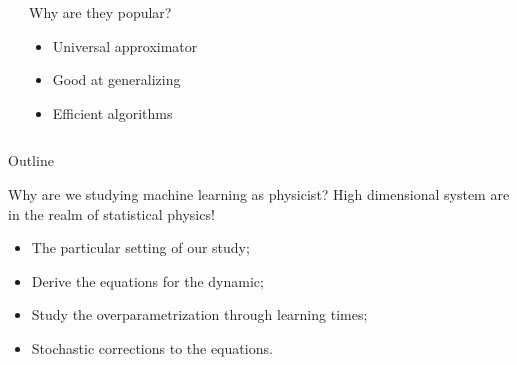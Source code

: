 \documentclass{beamer}
\begin{document}
\begin{frame}
\begin{columns}
    \begin{center}
      \begin{tikzpicture}[x=1.3cm, y=.78cm, >=latex]
      
      \end{tikzpicture}
    \end{center}

  \pause
  \begin{exampleblock}{Why are they popular?}
          \begin{itemize}
            \item Universal approximator
            \item Good at generalizing
            \item Efficient algorithms
          \end{itemize}
  \end{exampleblock}
  \end{columns}
\end{frame}

\begin{frame}{Outline}
  \begin{exampleblock}{Why are we studying machine learning as physicist?}
    High dimensional system are in the realm of statistical physics!
  \end{exampleblock}
  \vfill
  \pause

  \begin{itemize}
    \item The particular setting of our study;
    \item Derive the equations for the dynamic;
    \item Study the overparametrization through learning times;
    \item Stochastic corrections to the equations.
  \end{itemize}
\end{frame}
\end{document}
